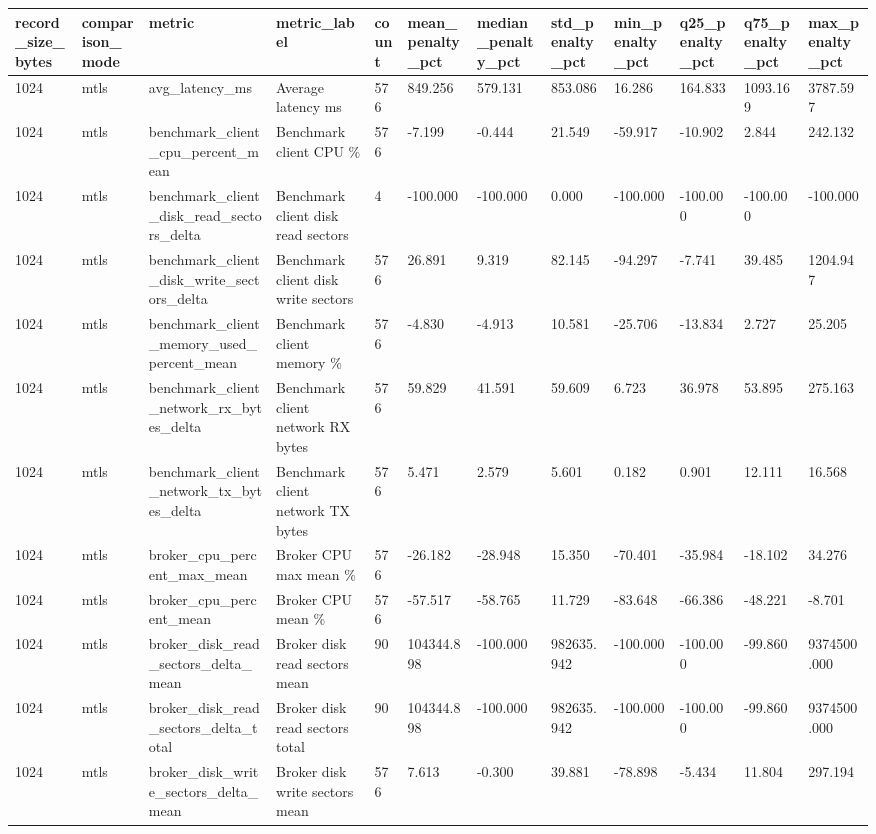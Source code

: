 \begin{longtable}{llllllllllll}
\hline
record\_size\_bytes & comparison\_mode & metric & metric\_label & count & mean\_penalty\_pct & median\_penalty\_pct & std\_penalty\_pct & min\_penalty\_pct & q25\_penalty\_pct & q75\_penalty\_pct & max\_penalty\_pct \\
\hline
1024 & mtls & avg\_latency\_ms & Average latency ms & 576 & 849.256 & 579.131 & 853.086 & 16.286 & 164.833 & 1093.169 & 3787.597 \\
1024 & mtls & benchmark\_client\_cpu\_percent\_mean & Benchmark client CPU \% & 576 & -7.199 & -0.444 & 21.549 & -59.917 & -10.902 & 2.844 & 242.132 \\
1024 & mtls & benchmark\_client\_disk\_read\_sectors\_delta & Benchmark client disk read sectors & 4 & -100.000 & -100.000 & 0.000 & -100.000 & -100.000 & -100.000 & -100.000 \\
1024 & mtls & benchmark\_client\_disk\_write\_sectors\_delta & Benchmark client disk write sectors & 576 & 26.891 & 9.319 & 82.145 & -94.297 & -7.741 & 39.485 & 1204.947 \\
1024 & mtls & benchmark\_client\_memory\_used\_percent\_mean & Benchmark client memory \% & 576 & -4.830 & -4.913 & 10.581 & -25.706 & -13.834 & 2.727 & 25.205 \\
1024 & mtls & benchmark\_client\_network\_rx\_bytes\_delta & Benchmark client network RX bytes & 576 & 59.829 & 41.591 & 59.609 & 6.723 & 36.978 & 53.895 & 275.163 \\
1024 & mtls & benchmark\_client\_network\_tx\_bytes\_delta & Benchmark client network TX bytes & 576 & 5.471 & 2.579 & 5.601 & 0.182 & 0.901 & 12.111 & 16.568 \\
1024 & mtls & broker\_cpu\_percent\_max\_mean & Broker CPU max mean \% & 576 & -26.182 & -28.948 & 15.350 & -70.401 & -35.984 & -18.102 & 34.276 \\
1024 & mtls & broker\_cpu\_percent\_mean & Broker CPU mean \% & 576 & -57.517 & -58.765 & 11.729 & -83.648 & -66.386 & -48.221 & -8.701 \\
1024 & mtls & broker\_disk\_read\_sectors\_delta\_mean & Broker disk read sectors mean & 90 & 104344.898 & -100.000 & 982635.942 & -100.000 & -100.000 & -99.860 & 9374500.000 \\
1024 & mtls & broker\_disk\_read\_sectors\_delta\_total & Broker disk read sectors total & 90 & 104344.898 & -100.000 & 982635.942 & -100.000 & -100.000 & -99.860 & 9374500.000 \\
1024 & mtls & broker\_disk\_write\_sectors\_delta\_mean & Broker disk write sectors mean & 576 & 7.613 & -0.300 & 39.881 & -78.898 & -5.434 & 11.804 & 297.194 \\

\end{longtable}
